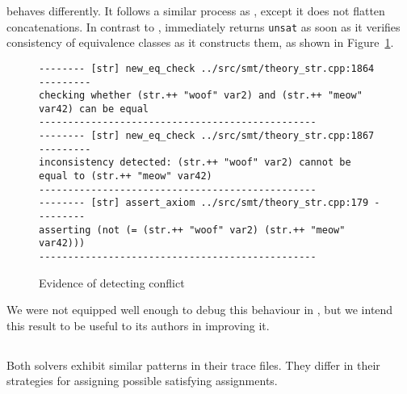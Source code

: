         \us{} behaves differently. It follows a similar process as \cvc{}, except it does not flatten concatenations. In contrast to \cvc{}, \us{} immediately returns \texttt{unsat} as soon as it verifies consistency of equivalence classes as it constructs them, as shown in Figure~\ref{fig:z3str3-conflict}.

        \begin{figure}[h]
            {\scriptsize\begin{verbatim}
-------- [str] new_eq_check ../src/smt/theory_str.cpp:1864 ---------
checking whether (str.++ "woof" var2) and (str.++ "meow" var42) can be equal
------------------------------------------------
-------- [str] new_eq_check ../src/smt/theory_str.cpp:1867 ---------
inconsistency detected: (str.++ "woof" var2) cannot be equal to (str.++ "meow" var42)
------------------------------------------------
-------- [str] assert_axiom ../src/smt/theory_str.cpp:179 ---------
asserting (not (= (str.++ "woof" var2) (str.++ "meow" var42)))
------------------------------------------------\end{verbatim}}
            \caption{Evidence of \us{} detecting conflict}
            \label{fig:z3str3-conflict}
        \end{figure}

        We were not equipped well enough to debug this behaviour in \cvc{}, but we intend this result to be useful to its authors in improving it.

    \subsection{\zHard{}}

        Both solvers exhibit similar patterns in their trace files. They differ in their strategies for assigning possible satisfying assignments.


